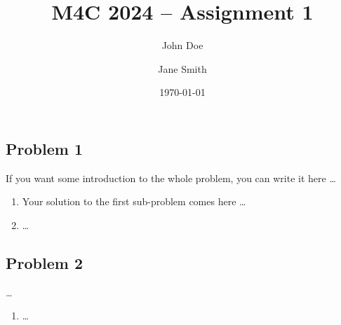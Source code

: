 \documentclass[a4paper,10pt]{article}
\title{M4C 2024 -- Assignment 1} %
\author{John Doe \and Jane Smith}
\date{\today}
\begin{document}
\maketitle

\subsection*{Problem 1}

If you want some introduction to the whole problem, you can write it here \ldots
 
\begin{enumerate}[label=(\alph*)]

 \item Your solution to the first sub-problem comes here \ldots

 \item \ldots

\end{enumerate}


\subsection*{Problem 2}

 \ldots
 
\begin{enumerate}[label=(\alph*)]

 \item \ldots

\end{enumerate}

\end{document}
